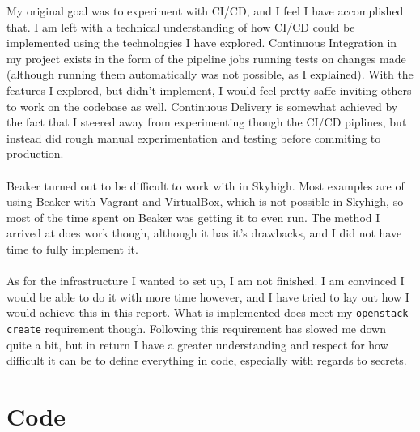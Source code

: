 My original goal was to experiment with CI/CD, and I feel I have accomplished that. I am left with a technical understanding of how CI/CD could be implemented using the technologies I have explored. Continuous Integration in my project exists in the form of the pipeline jobs running tests on changes made (although running them automatically was not possible, as I explained). With the features I explored, but didn't implement, I would feel pretty saffe inviting others to work on the codebase as well. Continuous Delivery is somewhat achieved by the fact that I steered away from experimenting though the CI/CD piplines, but instead did rough manual experimentation and testing before commiting to production.
\\
\\
Beaker turned out to be difficult to work with in Skyhigh. Most examples are of using Beaker with Vagrant and VirtualBox, which is not possible in Skyhigh, so most of the time spent on Beaker was getting it to even run. The method I arrived at does work though, although it has it's drawbacks, and I did not have time to fully implement it.
\\
\\
As for the infrastructure I wanted to set up, I am not finished. I am convinced I would be able to do it with more time however, and I have tried to lay out how I would achieve this in this report. What is implemented does meet my \texttt{openstack create} requirement though. Following this requirement has slowed me down quite a bit, but in return I have a greater understanding and respect for how difficult it can be to define everything in code, especially with regards to secrets.




\clearpage %

\nocite{*}



\clearpage %
\appendix

\section{Code}

